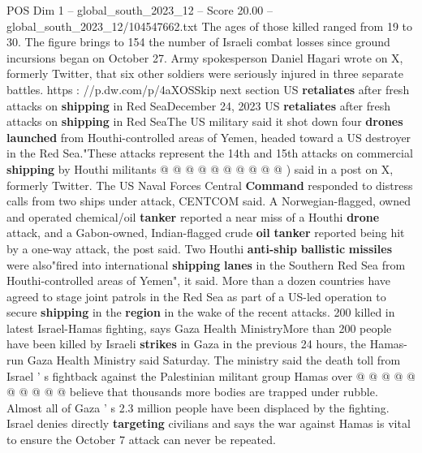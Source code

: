 \begin{textsample}{POS Dim 1 – global\_south\_2023\_12 – Score 20.00 – global\_south\_2023\_12/104547662.txt}
The ages of those killed ranged from 19 to 30.
The figure brings to 154 the number of Israeli combat losses since ground incursions began on October 27.
Army spokesperson Daniel Hagari wrote on X, formerly Twitter, that six other soldiers were seriously injured in three separate battles. https : //p.dw.com/p/4aXOSSkip next section US \textbf{retaliates} after fresh attacks on \textbf{shipping} in Red SeaDecember 24, 2023 US \textbf{retaliates} after fresh attacks on \textbf{shipping} in Red SeaThe US military said it shot down four \textbf{drones} \textbf{launched} from Houthi-controlled areas of Yemen, headed toward a US destroyer in the Red Sea."These attacks represent the 14th and 15th attacks on commercial \textbf{shipping} by Houthi militants @ @ @ @ @ @ @ @ @ @ ) said in a post on X, formerly Twitter.
The US Naval Forces Central \textbf{Command} responded to distress calls from two ships under attack, CENTCOM said.
A Norwegian-flagged, owned and operated chemical/oil \textbf{tanker} reported a near miss of a Houthi \textbf{drone} attack, and a Gabon-owned, Indian-flagged crude \textbf{oil} \textbf{tanker} reported being hit by a one-way attack, the post said.
Two Houthi \textbf{anti-ship} \textbf{ballistic} \textbf{missiles} were also"fired into international \textbf{shipping} \textbf{lanes} in the Southern Red Sea from Houthi-controlled areas of Yemen", it said.
More than a dozen countries have agreed to stage joint patrols in the Red Sea as part of a US-led operation to secure \textbf{shipping} in the \textbf{region} in the wake of the recent attacks. 200 killed in latest Israel-Hamas fighting, says Gaza Health MinistryMore than 200 people have been killed by Israeli \textbf{strikes} in Gaza in the previous 24 hours, the Hamas-run Gaza Health Ministry said Saturday.
The ministry said the death toll from Israel ' s fightback against the Palestinian militant group Hamas over @ @ @ @ @ @ @ @ @ @ believe that thousands more bodies are trapped under rubble.
Almost all of Gaza ' s 2.3 million people have been displaced by the fighting.
Israel denies directly \textbf{targeting} civilians and says the war against Hamas is vital to ensure the October 7 attack can never be repeated.

\end{textsample}
